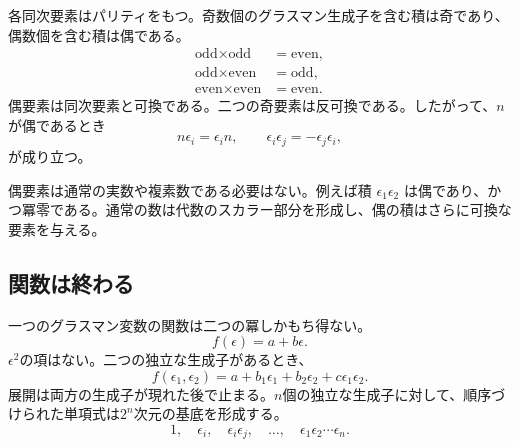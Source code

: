 各同次要素はパリティをもつ。奇数個のグラスマン生成子を含む積は奇であり、偶数個を含む積は偶である。
\begin{align}
\text{odd}\times\text{odd}&=\text{even},\\
\text{odd}\times\text{even}&=\text{odd},\\
\text{even}\times\text{even}&=\text{even}.
\end{align}
偶要素は同次要素と可換である。二つの奇要素は反可換である。したがって、\(n\)が偶であるとき
\begin{equation}
n\epsilon_i=\epsilon_i n,
\qquad
\epsilon_i\epsilon_j=-\epsilon_j\epsilon_i,
\end{equation}
が成り立つ。

偶要素は通常の実数や複素数である必要はない。例えば積
\(\epsilon_1\epsilon_2\)
は偶であり、かつ冪零である。通常の数は代数のスカラー部分を形成し、偶の積はさらに可換な要素を与える。

\begin{classroomqa}
\end{classroomqa}

\subsection{関数は終わる}

一つのグラスマン変数の関数は二つの冪しかもち得ない。
\begin{equation}
f(\epsilon)=a+b\epsilon.
\end{equation}
\(\epsilon^2\)の項はない。二つの独立な生成子があるとき、
\begin{equation}
f(\epsilon_1,\epsilon_2)
=a+b_1\epsilon_1+b_2\epsilon_2+c\epsilon_1\epsilon_2.
\end{equation}
展開は両方の生成子が現れた後で止まる。\(n\)個の独立な生成子に対して、順序づけられた単項式は\(2^n\)次元の基底を形成する。
\begin{equation}
1,\quad
\epsilon_i,\quad
\epsilon_i\epsilon_j,\quad
\ldots,\quad
\epsilon_1\epsilon_2\cdots\epsilon_n.
\end{equation}


